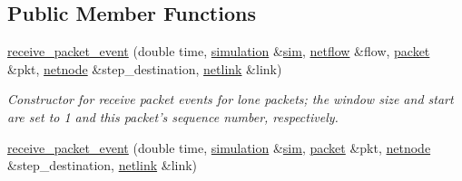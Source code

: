 \subsection*{Public Member Functions}
\begin{DoxyCompactItemize}
\item 
\hypertarget{classreceive__packet__event_ab160e0614169ef1ee78c52406a9dbcc4}{\hyperlink{classreceive__packet__event_ab160e0614169ef1ee78c52406a9dbcc4}{receive\-\_\-packet\-\_\-event} (double time, \hyperlink{classsimulation}{simulation} \&\hyperlink{classevent_a08c6d828bfb6f5539dcd1491e8ac77d2}{sim}, \hyperlink{classnetflow}{netflow} \&flow, \hyperlink{classpacket}{packet} \&pkt, \hyperlink{classnetnode}{netnode} \&step\-\_\-destination, \hyperlink{classnetlink}{netlink} \&link)}\label{classreceive__packet__event_ab160e0614169ef1ee78c52406a9dbcc4}

\begin{DoxyCompactList}\small\item\em Constructor for receive packet events for lone packets; the window size and start are set to 1 and this packet's sequence number, respectively. \end{DoxyCompactList}\item 
\hypertarget{classreceive__packet__event_a62cf5ad6dc6702e99182f297ad46f877}{\hyperlink{classreceive__packet__event_a62cf5ad6dc6702e99182f297ad46f877}{receive\-\_\-packet\-\_\-event} (double time, \hyperlink{classsimulation}{simulation} \&\hyperlink{classevent_a08c6d828bfb6f5539dcd1491e8ac77d2}{sim}, \hyperlink{classpacket}{packet} \&pkt, \hyperlink{classnetnode}{netnode} \&step\-\_\-destination, \hyperlink{classnetlink}{netlink} \&link)}\label{classreceive__packet__event_a62cf5ad6dc6702e99182f297ad46f877}


\end{DoxyCompactItemize}

